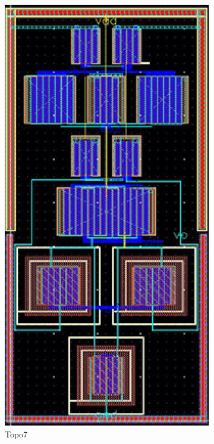 \begin{figure}[ht]
\begin{subfigure}[t]{0.2\textwidth}
        \includegraphics[width=\textwidth]{Fig/MultTopo_Topo7.eps}
        \caption{Topo7}\label{fig:Topo7}
        \end{subfigure}
        \begin{subfigure}[t]{0.2\textwidth}

\end{subfigure}
\end{figure}
